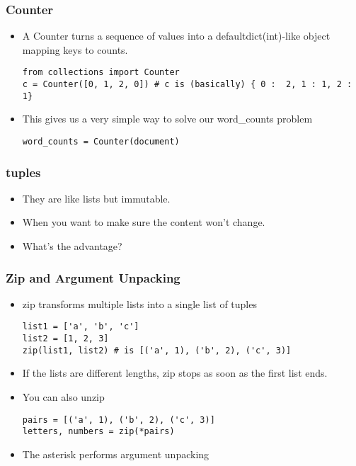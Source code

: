 \begin{frame}[fragile]\frametitle{Counter}
  \begin{itemize}
  \item A Counter turns a sequence of values into a defaultdict(int)-like object mapping keys to counts.	
  \begin{lstlisting}
from collections import Counter
c = Counter([0, 1, 2, 0]) # c is (basically) { 0 :	2, 1 : 1, 2 : 1}
  \end{lstlisting}
\item This gives us a very simple way to	solve our word\_counts problem
  \begin{lstlisting}
word_counts	= Counter(document)
  \end{lstlisting}
  \end{itemize}
\end{frame}


\begin{frame}[fragile]\frametitle{tuples}
  \begin{itemize}
  \item They are like lists but immutable. 
  \item When you want to make sure the content won't change.
  \item What's the advantage?
  \end{itemize}
\end{frame}


\begin{frame}[fragile]\frametitle{Zip and Argument Unpacking}
  \begin{itemize}
  \item zip transforms multiple lists into a single list of tuples
  \begin{lstlisting}
list1 = ['a', 'b', 'c']
list2 = [1, 2, 3]
zip(list1, list2) # is [('a', 1), ('b', 2), ('c', 3)]
  \end{lstlisting}
\item 	If the	lists are different lengths, zip stops as soon as the first list ends.
\item You can also unzip
  \begin{lstlisting}
pairs = [('a', 1), ('b', 2), ('c', 3)]
letters, numbers = zip(*pairs)
  \end{lstlisting}
\item The asterisk performs argument unpacking
  \end{itemize}
\end{frame}

